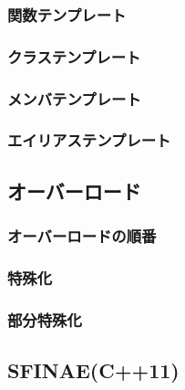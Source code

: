 \subsubsection*{関数テンプレート}

\subsubsection*{クラステンプレート}

\subsubsection*{メンバテンプレート}

\subsubsection*{エイリアステンプレート}

\subsection{オーバーロード}

\subsubsection{オーバーロードの順番}

\subsubsection{特殊化}

\subsubsection{部分特殊化}


\subsection{SFINAE(C++11)}



